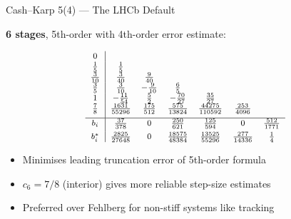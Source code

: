 \documentclass[aspectratio=169, 11pt]{beamer}
\begin{document}
\begin{frame}{Cash--Karp 5(4) --- The LHCb Default}

\textbf{6 stages}, 5th-order with 4th-order error estimate:

\begin{equation*}
\renewcommand{\arraystretch}{1.1}
{\footnotesize
\begin{array}{c|cccccc}
  0          &   \\
  \frac{1}{5}      & \frac{1}{5} \\
  \frac{3}{10}     & \frac{3}{40}    & \frac{9}{40} \\
  \frac{3}{5}      & \frac{3}{10}    & -\frac{9}{10}  & \frac{6}{5} \\
  1          & -\frac{11}{54}& \frac{5}{2}    & -\frac{70}{27}& \frac{35}{27} \\
  \frac{7}{8}      & \frac{1631}{55296} & \frac{175}{512} &
    \frac{575}{13824} & \frac{44275}{110592} & \frac{253}{4096} \\[4pt]
  \hline
  b_i  & \frac{37}{378} & 0 & \frac{250}{621} & \frac{125}{594} & 0 &
    \frac{512}{1771} \\[3pt]
  b^*_i & \frac{2825}{27648} & 0 & \frac{18575}{48384} &
    \frac{13525}{55296} & \frac{277}{14336} & \frac{1}{4}
\end{array}
}
\end{equation*}

\vspace{4pt}
\begin{itemize}
  \item Minimises leading truncation error of 5th-order formula
  \item $c_6 = 7/8$ (interior) gives more reliable step-size estimates
  \item Preferred over Fehlberg for non-stiff systems like tracking
\end{itemize}
\end{frame}
\end{document}
